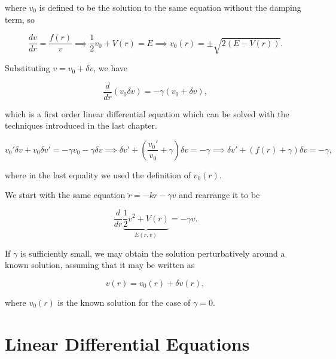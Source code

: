 \documentclass[english,a4paper,12pt]{report}
\begin{document}
where \(v_0 \) is defined to be the solution to the same equation without the damping term, so

\begin{equation}
    \frac{dv}{dr} = \frac{f(r)}{v} \implies \frac{1}{2} v_0  + V(r) = E \implies v_0 (r) = \pm \sqrt{2(E-V(r))} .  
\end{equation}

Substituting \(v = v_0  + \delta v\), we have 

\begin{equation}
    \frac{d}{dr}(v_0 \delta v) = -\gamma (v_0 +\delta v), 
\end{equation}

which is a first order linear differential equation which can be solved with the techniques introduced in the last chapter.

\begin{equation}
    v_0 '\delta v + v_0  \delta v' = -\gamma v_0 -\gamma \delta v \implies \delta v' + \left( \frac{v_0 '}{v_0 } + \gamma  \right) \delta v = -\gamma  \implies \delta v' + (f(r) + \gamma )\delta v = -\gamma,
\end{equation}

where in the last equality we used the definition of \(v_0 (r)\). 










{}
{We start with the same equation \(\ddot{r} = -kr-\gamma v \) and rearrange it to be

\begin{equation}
    \frac{d}{dr}\underbrace{\frac{1}{2}v^2+V(r) }_{E(r,v)} = -\gamma v. 
\end{equation}

If \(\gamma \) is sufficiently small, we may obtain the solution perturbatively around a known solution, assuming that it may be written as 

\begin{equation}
    v(r) = v_0 (r) + \delta v(r),
\end{equation}

where \(v_0 (r)\) is the known solution for the case of \(\gamma  = 0\).   

}  


\chapter{Linear Differential Equations}
\end{document}
